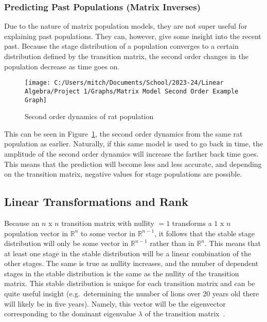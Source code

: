 \documentclass{article}
\begin{document}
    \subsubsection{Predicting Past Populations (Matrix Inverses)}

    \hspace{\parindent}Due to the nature of matrix population models, they are not super useful for explaining past populations.
    They can, however, give some insight into the recent past.
    Because the stage distribution of a population converges to a certain distribution defined by the transition matrix, the second order changes in the population decrease as time goes on.
    \begin{figure} [!h]
        \centering
        \texttt{[image: C:/Users/mitch/Documents/School/2023-24/Linear Algebra/Project 1/Graphs/Matrix Model Second Order Example Graph]}
        \caption{Second order dynamics of rat population}
        \label{fig:sec_order_ex}
    \end{figure}
    This can be seen in Figure~\ref{fig:sec_order_ex}, the second order dynamics from the same rat population as earlier.
    Naturally, if this same model is used to go back in time, the amplitude of the second order dynamics will increase the farther back time goes.
    This means that the prediction will become less and less accurate, and depending on the transition matrix, negative values for stage populations are possible.

    \subsection{Linear Transformations and Rank}\label{subsec:linear-transformations-and-rank}

    \hspace{\parindent}Because an $n$ x $n$ transition matrix with nullity $= 1$ transforms a $1$ x $n$ population vector in $\mathbb{R}^n$ to some vector in $\mathbb{R}^{n-1}$, it follows that the stable stage distribution will only be some vector in $\mathbb{R}^{n-1}$ rather than in $\mathbb{R}^n$.
    This means that at least one stage in the stable distribution will be a linear combination of the other stages.
    The same is true as nullity increases, and the number of dependent stages in the stable distribution is the same as the nullity of the transition matrix.
    This stable distribution is unique for each transition matrix and can be quite useful insight (e.g.~determining the number of lions over 20 years old there will likely be in five years).
    Namely, this vector will be the eigenvector corresponding to the dominant eigenvalue $\lambda$ of the transition matrix~\cite{shoemaker_lab_2024}.
\end{document}
